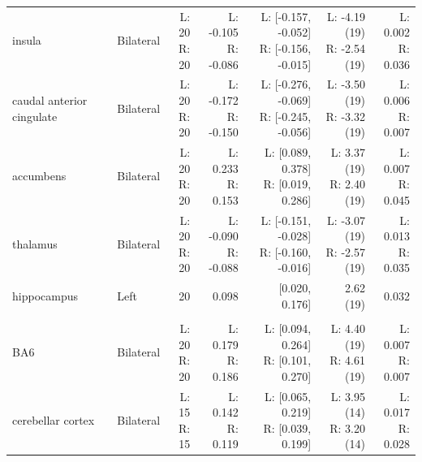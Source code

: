 \begin{longtable}{@{}llrrrrr@{}}
insula & Bilateral & \shortstack[r]{L: 20\\R: 20} & \shortstack[r]{L: -0.105\\R: -0.086} & \shortstack[r]{L: [-0.157, -0.052]\\R: [-0.156, -0.015]} & \shortstack[r]{L: -4.19 (19)\\R: -2.54 (19)} & \shortstack[r]{L: 0.002\\R: 0.036} \\*
caudal anterior cingulate & Bilateral & \shortstack[r]{L: 20\\R: 20} & \shortstack[r]{L: -0.172\\R: -0.150} & \shortstack[r]{L: [-0.276, -0.069]\\R: [-0.245, -0.056]} & \shortstack[r]{L: -3.50 (19)\\R: -3.32 (19)} & \shortstack[r]{L: 0.006\\R: 0.007} \\*
accumbens & Bilateral & \shortstack[r]{L: 20\\R: 20} & \shortstack[r]{L: 0.233\\R: 0.153} & \shortstack[r]{L: [0.089, 0.378]\\R: [0.019, 0.286]} & \shortstack[r]{L: 3.37 (19)\\R: 2.40 (19)} & \shortstack[r]{L: 0.007\\R: 0.045} \\*
thalamus & Bilateral & \shortstack[r]{L: 20\\R: 20} & \shortstack[r]{L: -0.090\\R: -0.088} & \shortstack[r]{L: [-0.151, -0.028]\\R: [-0.160, -0.016]} & \shortstack[r]{L: -3.07 (19)\\R: -2.57 (19)} & \shortstack[r]{L: 0.013\\R: 0.035} \\*
hippocampus & Left & 20 & 0.098 & [0.020, 0.176] & 2.62 (19) & 0.032 \\
\addlinespace
\multicolumn{7}{l}{\textbf{Early}} \\*
BA6 & Bilateral & \shortstack[r]{L: 20\\R: 20} & \shortstack[r]{L: 0.179\\R: 0.186} & \shortstack[r]{L: [0.094, 0.264]\\R: [0.101, 0.270]} & \shortstack[r]{L: 4.40 (19)\\R: 4.61 (19)} & \shortstack[r]{L: 0.007\\R: 0.007} \\*
cerebellar cortex & Bilateral & \shortstack[r]{L: 15\\R: 15} & \shortstack[r]{L: 0.142\\R: 0.119} & \shortstack[r]{L: [0.065, 0.219]\\R: [0.039, 0.199]} & \shortstack[r]{L: 3.95 (14)\\R: 3.20 (14)} & \shortstack[r]{L: 0.017\\R: 0.028} \\*

\end{longtable}
